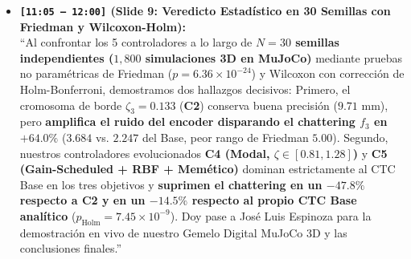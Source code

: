 \documentclass[11pt,a4paper]{article}
\begin{document}
\begin{itemize}
    \item \textbf{\texttt{[11:05 -- 12:00]} (Slide 9: Veredicto Estadístico en 30 Semillas con Friedman y Wilcoxon-Holm):} \\
    ``Al confrontar los 5 controladores a lo largo de \textbf{$N = 30$ semillas independientes ($1,800$ simulaciones 3D en MuJoCo)} mediante pruebas no paramétricas de Friedman ($p = 6.36 \times 10^{-24}$) y Wilcoxon con corrección de Holm-Bonferroni, demostramos dos hallazgos decisivos: Primero, el cromosoma de borde $\zeta_3 = 0.133$ (\textbf{C2}) conserva buena precisión ($9.71\text{ mm}$), pero \textbf{amplifica el ruido del encoder disparando el chattering $f_3$ en $+64.0\%$} ($3.684$ vs. $2.247$ del Base, peor rango de Friedman $5.00$). Segundo, nuestros controladores evolucionados \textbf{C4 (Modal, $\zeta \in [0.81, 1.28]$)} y \textbf{C5 (Gain-Scheduled + RBF + Memético)} dominan estrictamente al CTC Base en los tres objetivos y \textbf{suprimen el chattering en un $-47.8\%$ respecto a C2 y en un $-14.5\%$ respecto al propio CTC Base analítico} ($p_{\text{Holm}} = 7.45 \times 10^{-9}$). Doy pase a José Luis Espinoza para la demostración en vivo de nuestro Gemelo Digital MuJoCo 3D y las conclusiones finales.''
\end{itemize}

\end{document}
